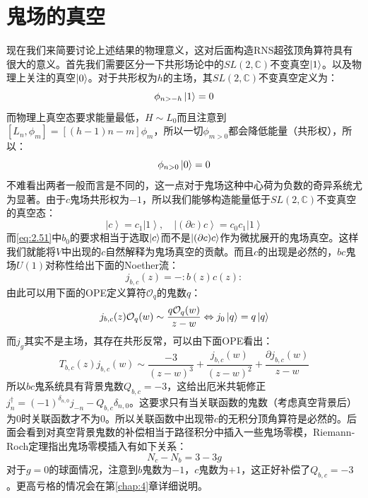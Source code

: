\section{鬼场的真空}
现在我们来简要讨论上述结果的物理意义，这对后面构造RNS超弦顶角算符具有很大的意义。首先我们需要区分一下共形场论中的$SL(2,\mathbb{C})$不变真空$\ket{1}$。以及物理上关注的真空$\ket{0}$。对于共形权为$h$的主场，其$SL(2,\mathbb{C})$不变真空定义为：
\begin{equation}
	\phi_{n>-h}\ket{1}=0
\end{equation}
而物理上真空态要求能量最低，$H\sim L_0$而且注意到$[L_n,\phi_m]=[(h-1)n-m]\phi_m$，所以一切$\phi_{m>0}$都会降低能量（共形权），所以：
\begin{equation}
	\phi_{n>0}\ket{0}=0
\end{equation}
不难看出两者一般而言是不同的，这一点对于鬼场这种中心荷为负数的奇异系统尤为显著。由于$c$鬼场共形权为$-1$，所以我们能够构造能量低于$SL(2,\mathbb{C})$不变真空的真空态：
\begin{equation}
	\label{eq:2.62}
	\left|c\right\rangle=c_{1}\left|1\right\rangle,\quad\left|(\partial c)c\right\rangle=c_{0}c_{1}\left|1\right\rangle
\end{equation}
而\ref{eq:2.51}中$b_0$的要求相当于选取$\ket{c}$而不是$\ket{(\partial c) c}$作为微扰展开的鬼场真空。这样我们就能将$V$中出现的$c$自然解释为鬼场真空的贡献。而且$c$的出现是必然的，$bc$鬼场$U(1)$对称性给出下面的Noether流：
\begin{equation}
	\label{eq:2.63}
	j_{b,c}(z)=-:b(z)c(z):
\end{equation}
由此可以用下面的OPE定义算符$\mathcal{O}_q$的鬼数$q$：
\begin{equation}
	j_{b,c}(z)\mathcal{O}_q(w)\sim\frac{q\mathcal{O}_q(w)}{z-w}\Leftrightarrow j_0\ket{q} = q\ket{q}
\end{equation}
而$j_g$其实不是主场，其存在共形反常，可以由下面OPE看出：
\begin{equation}
	T_{b,c}(z)j_{b,c}(w)\sim\frac{-3}{(z-w)^3}+\frac{j_{b,c}(w)}{(z-w)^2}+\frac{\partial j_{b,c}(w)}{z-w}
\end{equation}
所以$bc$鬼系统具有背景鬼数$Q_{b,c}=-3$，这给出厄米共轭修正$j_n^\dagger=(-1)^{\delta_{n,0}}j_{-n}-Q_{b,c}\delta_{n,0}$。这要求只有当关联函数的鬼数（考虑真空背景后）为$0$时关联函数才不为$0$。所以关联函数中出现带$c$的无积分顶角算符是必然的。后面会看到对真空背景鬼数的补偿相当于路径积分中插入一些鬼场零模，Riemann-Roch定理指出鬼场零模插入有如下关系：
\begin{equation}
	\label{eq:2.66}
	N_c-N_b=3-3g
\end{equation}
对于$g=0$的球面情况，注意到$b$鬼数为$-1$，$c$鬼数为$+1$，这正好补偿了$Q_{b,c}=-3$。更高亏格的情况会在第\ref{chap:4}章详细说明。

